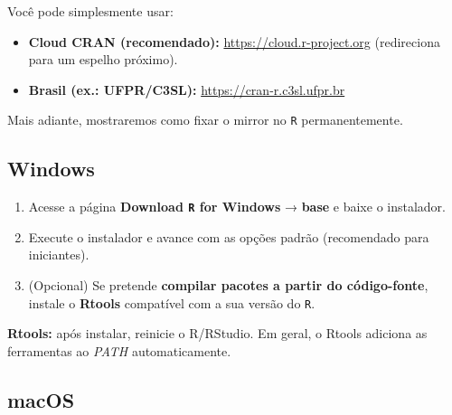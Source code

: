 \documentclass[
  letterpaper,
  DIV=11,
  numbers=noendperiod]{scrreprt}
\begin{document}
Você pode simplesmente usar:

\begin{itemize}
\item
  \textbf{Cloud CRAN (recomendado):} \url{https://cloud.r-project.org}
  (redireciona para um espelho próximo).
\item
  \textbf{Brasil (ex.: UFPR/C3SL):} \url{https://cran-r.c3sl.ufpr.br}
\end{itemize}

Mais adiante, mostraremos como fixar o mirror no \texttt{R}
permanentemente.

\subsection*{Windows}\label{windows}

\begin{enumerate}
\def\labelenumi{\arabic{enumi}.}
\item
  Acesse a página \textbf{Download \texttt{R} for Windows} →
  \textbf{base} e baixe o instalador.
\item
  Execute o instalador e avance com as opções padrão (recomendado para
  iniciantes).
\item
  (Opcional) Se pretende \textbf{compilar pacotes a partir do
  código-fonte}, instale o \textbf{Rtools} compatível com a sua versão
  do \texttt{R}.
\end{enumerate}

\begin{tcolorbox}[enhanced jigsaw, left=2mm, toprule=.15mm, opacityback=0, title=\textcolor{quarto-callout-tip-color}{\faLightbulb}\hspace{0.5em}{Dica}, leftrule=.75mm, breakable, colbacktitle=quarto-callout-tip-color!10!white, coltitle=black, rightrule=.15mm, bottomtitle=1mm, toptitle=1mm, colframe=quarto-callout-tip-color-frame, colback=white, opacitybacktitle=0.6, bottomrule=.15mm, arc=.35mm, titlerule=0mm]

\textbf{Rtools:} após instalar, reinicie o R/RStudio. Em geral, o Rtools
adiciona as ferramentas ao \emph{PATH} automaticamente.

\end{tcolorbox}

\subsection*{macOS}\label{macos}
\end{document}
